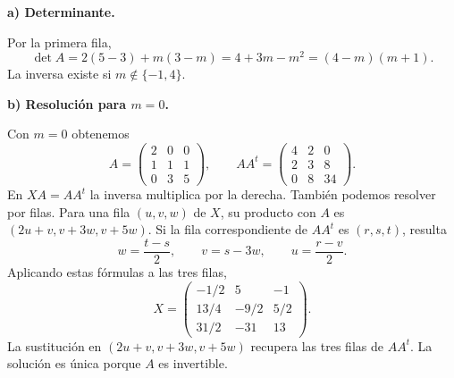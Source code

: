 \textbf{a) Determinante.}\par\nopagebreak[4]
Por la primera fila,
\[
\det A=2(5-3)+m(3-m)=4+3m-m^2=(4-m)(m+1).
\]
La inversa existe si $\boxed{m\notin\{-1,4\}}$.

\textbf{b) Resolución para $m=0$.}\par\nopagebreak[4]
Con $m=0$ obtenemos
\[
A=\begin{pmatrix}2&0&0\\1&1&1\\0&3&5\end{pmatrix},
\qquad AA^t=\begin{pmatrix}4&2&0\\2&3&8\\0&8&34\end{pmatrix}.
\]
En $XA=AA^t$ la inversa multiplica por la derecha. También podemos resolver por filas. Para una fila $(u,v,w)$ de $X$, su producto con $A$ es $(2u+v,v+3w,v+5w)$. Si la fila correspondiente de $AA^t$ es $(r,s,t)$, resulta
\[
w=\frac{t-s}{2},\qquad v=s-3w,\qquad u=\frac{r-v}{2}.
\]
Aplicando estas fórmulas a las tres filas,
\[
\boxed{X=\begin{pmatrix}-1/2&5&-1\\13/4&-9/2&5/2\\31/2&-31&13\end{pmatrix}.}
\]
La sustitución en $(2u+v,v+3w,v+5w)$ recupera las tres filas de $AA^t$. La solución es única porque $A$ es invertible.
